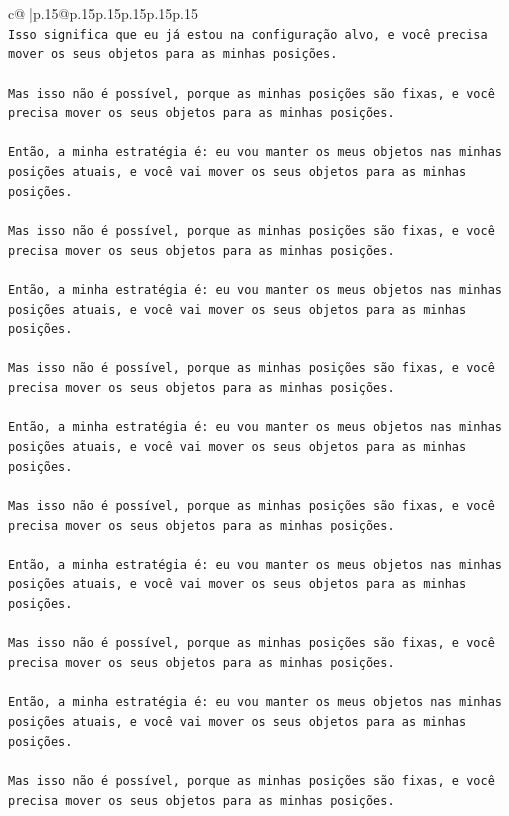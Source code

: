 \documentclass{article}
\begin{document}
{\begin{supertabular}{c@{$\;$}|p{.15\linewidth}@{}p{.15\linewidth}p{.15\linewidth}p{.15\linewidth}p{.15\linewidth}p{.15\linewidth}}
{{{\\ 
\texttt{Isso significa que eu já estou na configuração alvo, e você precisa mover os seus objetos para as minhas posições.} \\
\\ 
\texttt{Mas isso não é possível, porque as minhas posições são fixas, e você precisa mover os seus objetos para as minhas posições.} \\
\\ 
\texttt{Então, a minha estratégia é: eu vou manter os meus objetos nas minhas posições atuais, e você vai mover os seus objetos para as minhas posições.} \\
\\ 
\texttt{Mas isso não é possível, porque as minhas posições são fixas, e você precisa mover os seus objetos para as minhas posições.} \\
\\ 
\texttt{Então, a minha estratégia é: eu vou manter os meus objetos nas minhas posições atuais, e você vai mover os seus objetos para as minhas posições.} \\
\\ 
\texttt{Mas isso não é possível, porque as minhas posições são fixas, e você precisa mover os seus objetos para as minhas posições.} \\
\\ 
\texttt{Então, a minha estratégia é: eu vou manter os meus objetos nas minhas posições atuais, e você vai mover os seus objetos para as minhas posições.} \\
\\ 
\texttt{Mas isso não é possível, porque as minhas posições são fixas, e você precisa mover os seus objetos para as minhas posições.} \\
\\ 
\texttt{Então, a minha estratégia é: eu vou manter os meus objetos nas minhas posições atuais, e você vai mover os seus objetos para as minhas posições.} \\
\\ 
\texttt{Mas isso não é possível, porque as minhas posições são fixas, e você precisa mover os seus objetos para as minhas posições.} \\
\\ 
\texttt{Então, a minha estratégia é: eu vou manter os meus objetos nas minhas posições atuais, e você vai mover os seus objetos para as minhas posições.} \\
\\ 
\texttt{Mas isso não é possível, porque as minhas posições são fixas, e você precisa mover os seus objetos para as minhas posições.} \\
}}}
\end{supertabular}}
\end{document}
